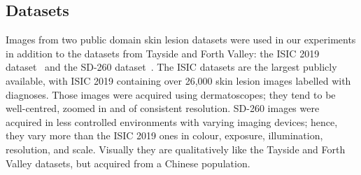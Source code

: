 \subsection{Datasets}
\label{subsec:generalisation_datasets}
Images from two public domain skin lesion datasets were used in our experiments in addition to the datasets from Tayside and Forth Valley: the ISIC 2019 dataset~\citep{codella2018skin,combalia2019bcn20000,tschandl2018ham10000} and the SD-260 dataset~\citep{yang2019self}. The ISIC datasets are the largest publicly available, with ISIC 2019 containing over 26,000 skin lesion images labelled with diagnoses. Those images were acquired using dermatoscopes; they tend to be well-centred, zoomed in and of consistent resolution. SD-260 images were acquired in less controlled environments with varying imaging devices; hence, they vary more than the ISIC 2019 ones in colour, exposure, illumination, resolution, and scale. Visually they are qualitatively like the Tayside and Forth Valley datasets, but acquired from a Chinese population.

